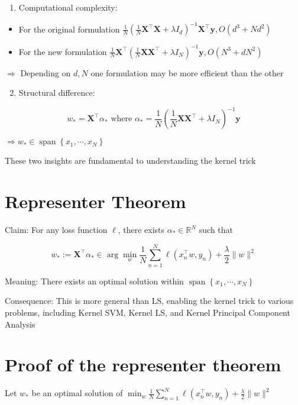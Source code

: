 \begin{enumerate}
  \item Computational complexity:
\end{enumerate}

\begin{itemize}
  \item For the original formulation $\frac{1}{N}\left(\frac{1}{N} \mathbf{X}^{\top} \mathbf{X}+\lambda I_{d}\right)^{-1} \mathbf{X}^{\top} \mathbf{y}, O\left(d^{3}+N d^{2}\right)$
  \item For the new formulation $\frac{1}{N} \mathbf{X}^{\top}\left(\frac{1}{N} \mathbf{X} \mathbf{X}^{\top}+\lambda I_{N}\right)^{-1} \mathbf{y}, O\left(N^{3}+d N^{2}\right)$
\end{itemize}

$\Rightarrow$ Depending on $d, N$ one formulation may be more efficient than the other

\begin{enumerate}
  \setcounter{enumi}{1}
  \item Structural difference:
\end{enumerate}

$$
w_{*}=\mathbf{X}^{\top} \alpha_{*} \text { where } \alpha_{*}=\frac{1}{N}\left(\frac{1}{N} \mathbf{X} \mathbf{X}^{\top}+\lambda I_{N}\right)^{-1} \mathbf{y}
$$

$\Rightarrow w_{*} \in \operatorname{span}\left\{x_{1}, \cdots, x_{N}\right\}$

These two insights are fundamental to understanding the kernel trick

\section*{Representer Theorem}
Claim: For any loss function $\ell$, there exists $\alpha_{*} \in \mathbb{R}^{N}$ such that

$$
w_{*}:=\mathbf{X}^{\top} \alpha_{*} \in \arg \min _{w} \frac{1}{N} \sum_{n=1}^{N} \ell\left(x_{n}^{\top} w, y_{n}\right)+\frac{\lambda}{2}\|w\|^{2}
$$

Meaning: There exists an optimal solution within $\operatorname{span}\left\{x_{1}, \cdots, x_{N}\right\}$

Consequence: This is more general than LS, enabling the kernel trick to various problems, including Kernel SVM, Kernel LS, and Kernel Principal Component Analysis

\section*{Proof of the representer theorem}
Let $w_{*}$ be an optimal solution of $\min _{w} \frac{1}{N} \sum_{n=1}^{N} \ell\left(x_{n}^{\top} w, y_{n}\right)+\frac{\lambda}{2}\|w\|^{2}$

